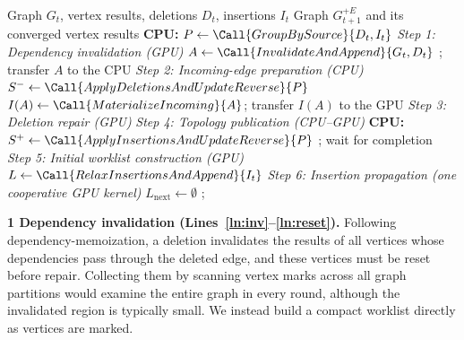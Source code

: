 \begin{algorithm}[t]
\caption{CPU--GPU cooperative processing of an update batch.}
\label{alg:process-batch}
\small
\begin{algorithmic}[1]
\Require Graph $G_t$, vertex results, deletions $D_t$, insertions $I_t$
\Ensure Graph $G_{t+1}^{+E}$ and its converged vertex results
\State \textbf{CPU:} $P \gets \Call{GroupBySource}{D_t,I_t}$ \label{ln:group}
\Statex \textit{Step 1: Dependency invalidation (GPU)}
\State $A \gets \Call{InvalidateAndAppend}{G_t,D_t}$  \label{ln:inv}
\State {}; transfer $A$ to the CPU \label{ln:reset}
\Statex \textit{Step 2: Incoming-edge preparation (CPU)}
\State $S^- \gets \Call{ApplyDeletionsAndUpdateReverse}{P}$ \label{ln:applydel}
\State $I(A) \gets \Call{MaterializeIncoming}{A}$; transfer $I(A)$ to the GPU \label{ln:incoming}
\Statex \textit{Step 3: Deletion repair (GPU)}
\Repeat \label{ln:repair-begin}
        \State {} 
    \EndFor
{}  \label{ln:repair-end}
\Statex \textit{Step 4: Topology publication (CPU--GPU)}
\State \textbf{CPU:} $S^+ \gets \Call{ApplyInsertionsAndUpdateReverse}{P}$ \label{ln:applyins}
\State {}; wait for completion \label{ln:publish}
\Statex \textit{Step 5: Initial worklist construction (GPU)}
\State $L \gets \Call{RelaxInsertionsAndAppend}{I_t}$ \label{ln:seed}
\Statex \textit{Step 6: Insertion propagation (one cooperative GPU kernel)}
 \label{ln:prop-begin}
    \State $L_{\mathrm{next}} \gets \emptyset$
         \label{ln:commit}
                 \label{ln:relax}
                    \State {} \label{ln:append}
                \EndIf
            \EndFor
        \EndIf
    \EndFor
    \State {};  \label{ln:prop-end}
\EndWhile
\end{algorithmic}
\end{algorithm}

\textbf{1 Dependency invalidation (Lines~\ref{ln:inv}--\ref{ln:reset}).} Following dependency-memoization, a deletion invalidates the results of all vertices whose dependencies pass through the deleted edge, and these vertices must be reset before repair. Collecting them by scanning vertex marks across all graph partitions would examine the entire graph in every round, although the invalidated region is typically small. We instead build a compact worklist directly as vertices are marked.

